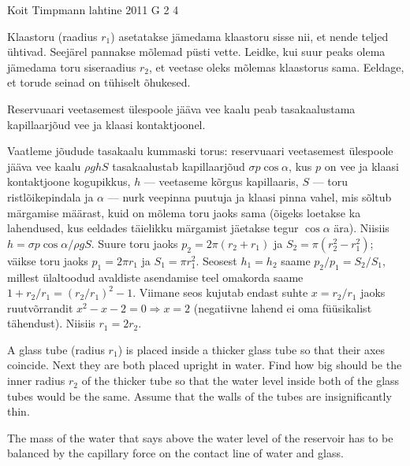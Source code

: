 {Koit Timpmann} %
{lahtine} %
{2011} %
{G 2} %
{4} %
{
\ifStatement
Klaastoru (raadius $r_1$) asetatakse jämedama klaastoru sisse nii, et nende teljed ühtivad. Seejärel
pannakse mõlemad püsti vette. Leidke, kui suur peaks olema jämedama toru
siseraadius $r_2$, et veetase oleks mõlemas klaastorus sama. Eeldage, et torude
seinad on tühiselt õhukesed.
\fi


\ifHint
Reservuaari veetasemest ülespoole jääva vee kaalu peab tasakaalustama kapillaarjõud vee ja klaasi kontaktjoonel.
\fi


\ifSolution
Vaatleme jõudude tasakaalu kummaski torus: reservuaari veetasemest
ülespoole jääva vee kaalu $\rho g h S$ tasakaalustab kapillaarjõud
$\sigma p \cos\alpha$, kus $p$ on vee ja klaasi kontaktjoone kogupikkus,
$h$ ---  veetaseme kõrgus kapillaaris, $S$ --- toru ristlõikepindala ja
$\alpha$ --- nurk veepinna puutuja ja klaasi pinna vahel, mis sõltub
märgamise määrast, kuid on mõlema toru jaoks sama (õigeks loetakse ka lahendused, 
kus eeldades täielikku märgamist jäetakse tegur $\cos\alpha$ ära). Niisiis $h=\sigma p
\cos\alpha/\rho g S$. Suure toru jaoks $p_2=2\pi (r_2+r_1)$ ja
$S_2=\pi(r_2^2-r_1^2)$; väikse toru jaoks $p_1=2\pi r_1$ ja $S_1=\pi
r_1^2$. Seosest $h_1=h_2$ saame $p_2/p_1=S_2/S_1$, millest ülaltoodud
avaldiste asendamise teel omakorda saame
$1+r_2/r_1=(r_2/r_1)^2-1$. Viimane seos kujutab endast suhte $x=r_2/r_1$
jaoks ruutvõrrandit $x^2-x-2=0 \Rightarrow x=2$ (negatiivne lahend ei
oma füüsikalist tähendust). Niisiis  $r_1=2 r_2$.
\fi


\ifEngStatement
A glass tube (radius $r_1$) is placed inside a thicker glass tube so that their axes coincide. Next they are both placed upright in water. Find how big should be the inner radius $r_2$ of the thicker tube so that the water level inside both of the glass tubes would be the same. Assume that the walls of the tubes are insignificantly thin.
\fi


\ifEngHint
The mass of the water that says above the water level of the reservoir has to be balanced by the capillary force on the contact line of water and glass.
\fi


}
